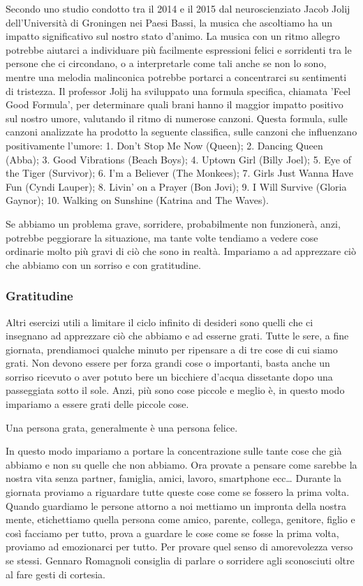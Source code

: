 \documentclass[12pt]{book} %
\begin{document}
Secondo uno studio condotto tra il 2014 e il 2015 dal neuroscienziato Jacob Jolij dell'Università di Groningen nei Paesi Bassi, la musica che ascoltiamo ha un impatto significativo sul nostro stato d'animo. La musica con un ritmo allegro potrebbe aiutarci a individuare più facilmente espressioni felici e sorridenti tra le persone che ci circondano, o a interpretarle come tali anche se non lo sono, mentre una melodia malinconica potrebbe portarci a concentrarci su sentimenti di tristezza. Il professor Jolij ha sviluppato una formula specifica, chiamata 'Feel Good Formula', per determinare quali brani hanno il maggior impatto positivo sul nostro umore, valutando il ritmo di numerose canzoni. Questa formula, sulle canzoni analizzate ha prodotto la seguente classifica, sulle canzoni che influenzano positivamente l'umore: 1. Don't Stop Me Now (Queen); 2. Dancing Queen (Abba); 3. Good Vibrations (Beach Boys); 4. Uptown Girl (Billy Joel); 5. Eye of the Tiger (Survivor); 6. I'm a Believer (The Monkees); 7. Girls Just Wanna Have Fun (Cyndi Lauper); 8. Livin' on a Prayer (Bon Jovi); 9. I Will Survive (Gloria Gaynor); 10. Walking on Sunshine (Katrina and The Waves).

Se abbiamo un problema grave, sorridere, probabilmente non funzionerà, anzi, potrebbe peggiorare la situazione, ma tante volte tendiamo a vedere
cose ordinarie molto più gravi di ciò che sono in realtà. Impariamo a ad apprezzare ciò che abbiamo con un sorriso e
con gratitudine.

\subsubsection{Gratitudine}
Altri esercizi utili a limitare il ciclo infinito
di desideri sono quelli che ci insegnano ad apprezzare ciò che abbiamo e ad esserne grati. Tutte le sere, a fine
giornata, prendiamoci qualche minuto per ripensare a di tre cose di cui siamo grati.
Non devono essere per forza grandi cose o importanti, basta anche un sorriso ricevuto o aver potuto bere un bicchiere
d'acqua dissetante dopo una passeggiata sotto il sole. Anzi, più
sono cose piccole e meglio è, in questo modo impariamo a essere grati delle piccole cose. 

Una persona grata, generalmente è una persona felice. 

In questo modo impariamo a portare la concentrazione sulle tante cose che già abbiamo e non su quelle che non abbiamo.
Ora provate a pensare come sarebbe la nostra vita senza partner, famiglia, amici, lavoro, smartphone ecc… Durante la
giornata proviamo a riguardare tutte queste cose come se fossero la prima volta. Quando guardiamo le persone attorno a
noi mettiamo un impronta della nostra mente, etichettiamo quella persona come amico, parente, collega, genitore, figlio
e così facciamo per tutto, prova a guardare le cose come se fosse la prima volta, proviamo ad emozionarci per tutto.
Per provare quel senso di amorevolezza verso se stessi. Gennaro Romagnoli consiglia di parlare o sorridere agli
sconosciuti oltre al fare gesti di cortesia.
\end{document}
